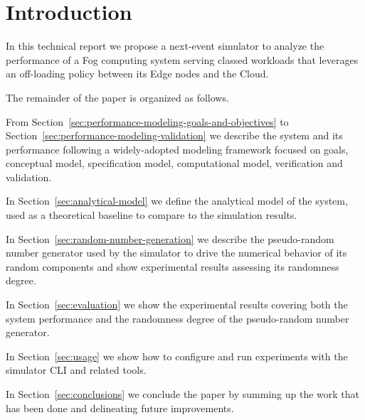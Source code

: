 \section{Introduction}
\label{sec:introduction}

In this technical report we propose a next-event simulator to analyze the performance of a Fog computing system serving classed workloads that leverages an off-loading policy between its Edge nodes and the Cloud.


The remainder of the paper is organized as follows.

From Section~\ref{sec:performance-modeling-goals-and-objectives} to Section~\ref{sec:performance-modeling-validation} we describe the system and its performance following a widely-adopted modeling framework focused on goals, conceptual model, specification model, computational model, verification and validation.

In Section~\ref{sec:analytical-model} we define the analytical model of the system, used as a theoretical baseline to compare to the simulation results.

In Section~\ref{sec:random-number-generation} we describe the pseudo-random number generator used by the simulator to drive the numerical behavior of its random components and show experimental results assessing its randomness degree.

In Section~\ref{sec:evaluation} we show the experimental results covering both the system performance and the randomness degree of the pseudo-random number generator.

In Section~\ref{sec:usage} we show how to configure and run experiments with the simulator CLI and related tools.

In Section~\ref{sec:conclusions} we conclude the paper by summing up the work that has been done and delineating future improvements.
